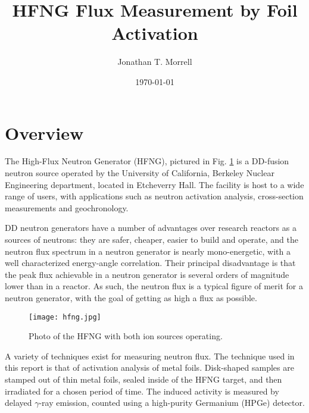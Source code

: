 \documentclass[aps,twocolumn,secnumarabic,balancelastpage,amsmath,amssymb,nofootinbib,floatfix]{revtex4-1}
\begin{document}
\title{HFNG Flux Measurement by Foil Activation}
\author{Jonathan T. Morrell}
\date{\today}
\setlength{\parskip}{1em}

\begin{abstract}

\end{abstract}

\maketitle


\section{Overview}

The High-Flux Neutron Generator (HFNG), pictured in Fig. \ref{fig:hfng} is a DD-fusion neutron source operated by the University of California, Berkeley Nuclear Engineering department, located in Etcheverry Hall.  The facility is host to a wide range of users, with applications such as neutron activation analysis, cross-section measurements and geochronology.

DD neutron generators have a number of advantages over research reactors as a sources of neutrons: they are safer, cheaper, easier to build and operate, and the neutron flux spectrum in a neutron generator is nearly mono-energetic, with a well characterized energy-angle correlation.  Their principal disadvantage is that the peak flux achievable in a neutron generator is several orders of magnitude lower than in a reactor.  As such, the neutron flux is a typical figure of merit for a neutron generator, with the goal of getting as high a flux as possible.

\begin{figure}[htb]
\texttt{[image: hfng.jpg]}
\caption{Photo of the HFNG with both ion sources operating.
}
\label{fig:hfng}
\end{figure}

A variety of techniques exist for measuring neutron flux.  The technique used in this report is that of activation analysis of metal foils.  Disk-shaped samples are stamped out of thin metal foils, sealed inside of the HFNG target, and then irradiated for a chosen period of time.  The induced activity is measured by delayed $\gamma$-ray emission, counted using a high-purity Germanium (HPGe) detector.
\end{document}
